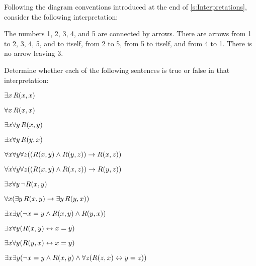 \problempart
\label{pr.TorF3}
Following the diagram conventions introduced at the end of \cref{s:Interpretations}, consider the following interpretation:	
\begin{center}
\begin{arialabel}{The numbers 1, 2, 3, 4, and 5 are connected by arrows. There are arrows from 1 to 2, 3, 4, 5, and to itself, from 2 to 5, from 5 to itself, and from 4 to 1. There is no arrow leaving 3.}
\end{arialabel}
\end{center}
Determine whether each of the following sentences is true or false in that interpretation:
\begin{compactlist}
\item $\exists x\, \mathord{R}(x,x)$
\item $\forall x\, \mathord{R}(x,x)$
\item $\exists x \forall y\, \mathord{R}(x,y)$
\item $\exists x \forall y\, \mathord{R}(y,x)$
\item $\forall x \forall y \forall z ((\mathord{R}(x,y) \wedge \mathord{R}(y,z)) \rightarrow \mathord{R}(x,z))$
\item $\forall x \forall y \forall z ((\mathord{R}(x,y) \wedge \mathord{R}(x,z)) \rightarrow \mathord{R}(y,z))$
\item $\exists x \forall y\, \neg \mathord{R}(x,y)$
\item $\forall x(\exists y\, \mathord{R}(x,y) \rightarrow \exists y\, \mathord{R}(y,x))$
\item $\exists x \exists y (\neg x = y \wedge \mathord{R}(x,y) \wedge \mathord{R}(y,x))$
\item $\exists x \forall y(\mathord{R}(x,y) \leftrightarrow x = y)$
\item $\exists x \forall y(\mathord{R}(y,x) \leftrightarrow x = y)$
\item $\exists x \exists y(\neg x = y \wedge \mathord{R}(x,y) \wedge \forall z(\mathord{R}(z,x) \leftrightarrow y = z))$
\end{compactlist}


